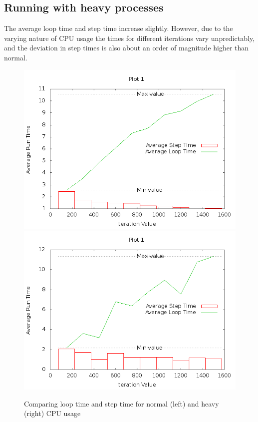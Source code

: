\documentclass[11pt]{article}
\begin{document}
\subsection{Running with heavy processes}
The average loop time and step time increase slightly. However, due to the varying nature of CPU usage the times for different iterations vary unpredictably, and the deviation in step times is also about an order of magnitude higher than normal.
\begin{figure}[h]
\centering
\includegraphics[scale=0.27]{g19_plot01.png}
\includegraphics[scale=0.27]{heavy_plot01.png}
\caption{Comparing loop time and step time for normal (left) and heavy (right) CPU usage}
\end{figure}
\end{document}
